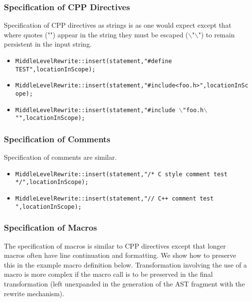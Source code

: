 \subsubsection{Specification of CPP Directives}
    Specification of CPP directives as strings is as one would expect
except that where quotes ("") appear in the string they must be escaped
($\backslash$"$\backslash$") to remain persistent in the input string.
\begin{itemize}
   \item {\tt MiddleLevelRewrite::insert(statement,"\#define TEST",locationInScope);}
   \item {\tt MiddleLevelRewrite::insert(statement,"\#include<foo.h>",locationInScope);}
   \item {\tt MiddleLevelRewrite::insert(statement,"\#include $\backslash$"foo.h$\backslash$"",locationInScope);}
\end{itemize}

\subsubsection{Specification of Comments}
    Specification of comments are similar.
\begin{itemize}
   \item {\tt MiddleLevelRewrite::insert(statement,"/* C style comment test */",locationInScope);}
   \item {\tt MiddleLevelRewrite::insert(statement,"// C++ comment test ",locationInScope);}
\end{itemize}

\subsubsection{Specification of Macros}
    The specification of macros is similar to CPP directives
except that longer macros often have line continuation and formatting.
We show how to preserve this in the example macro definition below.
Transformation involving the use of a macro is more complex if the
macro call is to be preserved in the final transformation 
(left unexpanded in the generation of the AST fragment with the 
rewrite mechanism).

